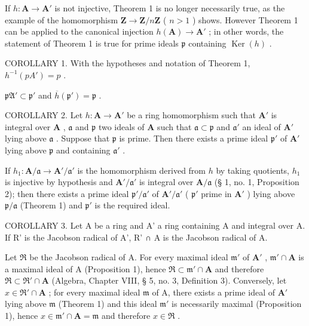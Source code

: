 If \(h: \mathbf{A} \to \mathbf{A}'\) is not injective, Theorem 1 is no longer necessarily true, as the example of the homomorphism \(\mathbf{Z} \to \mathbf{Z}/n\mathbf{Z}\) ( \(n > 1\) ) shows. However Theorem 1 can be applied to the canonical injection \(h(\mathbf{A}) \to \mathbf{A}'\) ; in other words, the statement of Theorem 1 is true for prime ideals \(\mathfrak{p}\) containing \(\operatorname{Ker}(h)\) .

COROLLARY 1. With the hypotheses and notation of Theorem 1, \(h^{-1}(pA') = p\) .

\(\mathfrak{pA}' \subset \mathfrak{p}'\) and \(\overline{h}(\mathfrak{p}') = \mathfrak{p}\) .

COROLLARY 2. Let \(h: \mathbf{A} \to \mathbf{A}'\) be a ring homomorphism such that \(\mathbf{A}'\) is integral over \(\mathbf{A}\) , \(\mathfrak{a}\) and \(\mathfrak{p}\) two ideals of \(\mathbf{A}\) such that \(\mathfrak{a} \subset \mathfrak{p}\) and \(\mathfrak{a}'\) an ideal of \(\mathbf{A}'\) lying above \(\mathfrak{a}\) . Suppose that \(\mathfrak{p}\) is prime. Then there exists a prime ideal \(\mathfrak{p}'\) of \(\mathbf{A}'\) lying above \(\mathfrak{p}\) and containing \(\mathfrak{a}'\) .

If \(h_1 \colon \mathbf{A} / \mathfrak{a} \to \mathbf{A}' / \mathfrak{a}'\) is the homomorphism derived from \(h\) by taking quotients, \(h_1\) is injective by hypothesis and \(\mathbf{A}' / \mathfrak{a}'\) is integral over \(\mathbf{A} / \mathfrak{a}\) (§ 1, no. 1, Proposition 2); then there exists a prime ideal \(\mathfrak{p}' / \mathfrak{a}'\) of \(\mathbf{A}' / \mathfrak{a}'\) ( \(\mathfrak{p}'\) prime in \(\mathbf{A}'\) ) lying above \(\mathfrak{p} / \mathfrak{a}\) (Theorem 1) and \(\mathfrak{p}'\) is the required ideal.

COROLLARY 3. Let A be a ring and A' a ring containing A and integral over A. If R' is the Jacobson radical of A', R' ∩ A is the Jacobson radical of A.

Let \(\mathfrak{R}\) be the Jacobson radical of A. For every maximal ideal \(\mathfrak{m}'\) of \(\mathbf{A}'\) , \(\mathfrak{m}' \cap \mathbf{A}\) is a maximal ideal of A (Proposition 1), hence \(\mathfrak{R} \subset \mathfrak{m}' \cap \mathbf{A}\) and therefore \(\mathfrak{R} \subset \mathfrak{R}' \cap \mathbf{A}\) (Algebra, Chapter VIII, § 5, no. 3, Definition 3). Conversely, let \(x \in \mathfrak{R}' \cap \mathbf{A}\) ; for every maximal ideal \(\mathfrak{m}\) of A, there exists a prime ideal of \(\mathbf{A}'\) lying above \(\mathfrak{m}\) (Theorem 1) and this ideal \(\mathfrak{m}'\) is necessarily maximal (Proposition 1), hence \(x \in \mathfrak{m}' \cap \mathbf{A} = \mathfrak{m}\) and therefore \(x \in \mathfrak{R}\) .

